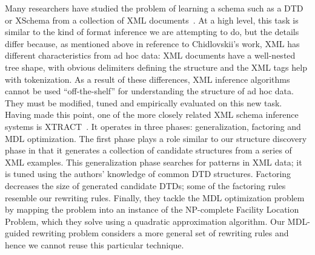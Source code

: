 Many researchers have studied the problem of learning
a schema such as a DTD or XSchema from a collection 
of XML
documents~\cite{bex+:dtd-inference,bex+:inferring-xml-schema,fernau:learning-xml,garofalakis+:xtract}.  
At a high level, this task is similar to the kind of format inference
we are attempting to do, but
the details differ because, as mentioned above in reference to
Chidlovskii's work, XML has different characteristics
from ad hoc data:  XML documents have a well-nested tree 
shape, with obvious delimiters defining the structure
and the XML tags help with tokenization.  
As a result of these differences,
XML inference algorithms cannot be used ``off-the-shelf'' for understanding
the structure of ad hoc data.  They must be modified, tuned and
empirically evaluated on this new task.
Having made this point,
one of the more closely related XML schema inference systems
is XTRACT~\cite{garofalakis+:xtract}.  
It operates in three phases: generalization,
factoring and MDL optimization.  The first phase plays a role similar to
our structure discovery phase in that it generates a
collection of candidate structures from a series of XML examples.
This generalization phase searches for patterns in XML
data; it is tuned using the authors' knowledge of common DTD
structures.  Factoring decreases the size of generated candidate DTDs;
some of the factoring rules resemble our rewriting rules.
Finally, they tackle the MDL optimization problem by mapping the
problem into an instance of the NP-complete Facility Location Problem,
which they solve using a quadratic approximation algorithm.
Our MDL-guided rewriting problem considers a more general set of
rewriting rules and hence we cannot reuse this particular technique.

